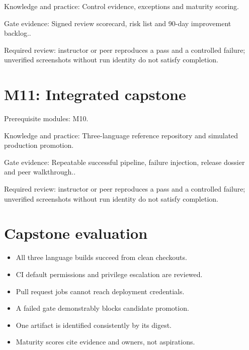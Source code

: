 \documentclass[11pt,letterpaper]{article}
\begin{document}
Knowledge and practice: Control evidence, exceptions and maturity scoring.

Gate evidence: Signed review scorecard, risk list and 90-day improvement backlog..

Required review: instructor or peer reproduces a pass and a controlled failure; unverified screenshots without run identity do not satisfy completion.

\section{M11: Integrated capstone}
Prerequisite modules: M10.

Knowledge and practice: Three-language reference repository and simulated production promotion.

Gate evidence: Repeatable successful pipeline, failure injection, release dossier and peer walkthrough..

Required review: instructor or peer reproduces a pass and a controlled failure; unverified screenshots without run identity do not satisfy completion.

\section{Capstone evaluation}
\begin{itemize}
\item All three language builds succeed from clean checkouts.
\item CI default permissions and privilege escalation are reviewed.
\item Pull request jobs cannot reach deployment credentials.
\item A failed gate demonstrably blocks candidate promotion.
\item One artifact is identified consistently by its digest.
\item Maturity scores cite evidence and owners, not aspirations.
\end{itemize}
\end{document}
